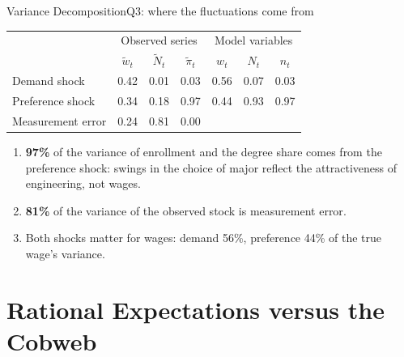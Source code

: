 \documentclass[10pt]{beamer}
\begin{document}
\begin{frame}{Variance Decomposition}{Q3: where the fluctuations come from}
  \begin{table}
    \centering\small
    \begin{tabular}{lccc|ccc}
      \toprule
      & \multicolumn{3}{c|}{Observed series} & \multicolumn{3}{c}{Model variables} \\
      & $\tilde w_t$ & $\tilde N_t$ & $\tilde\pi_t$ & $w_t$ & $N_t$ & $n_t$ \\
      \midrule
      Demand shock & 0.42 & 0.01 & 0.03 & 0.56 & 0.07 & 0.03 \\
      Preference shock & 0.34 & 0.18 & \alert{0.97} & 0.44 & 0.93 & \alert{0.97} \\
      Measurement error & 0.24 & \alert{0.81} & 0.00 & & & \\
      \bottomrule
    \end{tabular}
  \end{table}
  \vspace{0.2cm}
  \begin{enumerate}
    \item \textbf{97\%} of the variance of enrollment and the degree share comes from the \alert{preference shock}: swings in the choice of major reflect the attractiveness of engineering, not wages.
    \item \textbf{81\%} of the variance of the observed stock is \alert{measurement error}.
    \item Both shocks matter for wages: demand 56\%, preference 44\% of the true wage's variance.
  \end{enumerate}
\end{frame}

\section[RE vs.\ Cobweb]{Rational Expectations versus the Cobweb}
\end{document}

